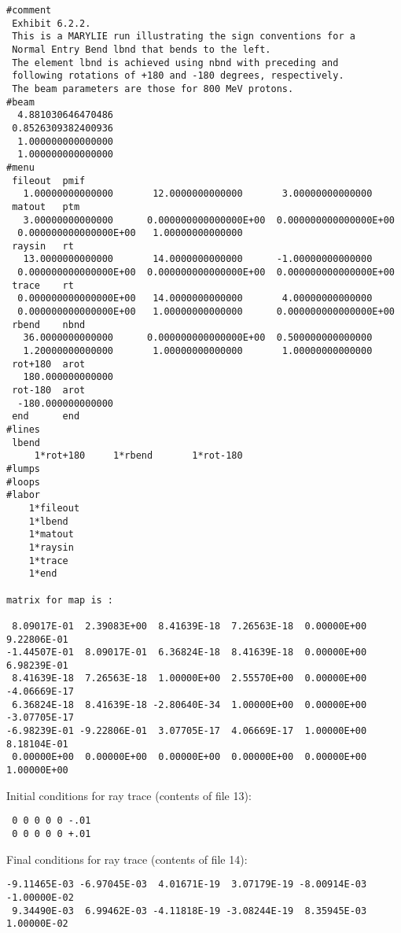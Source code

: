 \newpage
\begin{footnotesize}
\begin{verbatim}
#comment
 Exhibit 6.2.2.
 This is a MARYLIE run illustrating the sign conventions for a
 Normal Entry Bend lbnd that bends to the left.
 The element lbnd is achieved using nbnd with preceding and
 following rotations of +180 and -180 degrees, respectively.
 The beam parameters are those for 800 MeV protons.
#beam
  4.881030646470486
 0.8526309382400936
  1.000000000000000
  1.000000000000000
#menu
 fileout  pmif
   1.00000000000000       12.0000000000000       3.00000000000000
 matout   ptm
   3.00000000000000      0.000000000000000E+00  0.000000000000000E+00
  0.000000000000000E+00   1.00000000000000
 raysin   rt
   13.0000000000000       14.0000000000000      -1.00000000000000
  0.000000000000000E+00  0.000000000000000E+00  0.000000000000000E+00
 trace    rt
  0.000000000000000E+00   14.0000000000000       4.00000000000000
  0.000000000000000E+00   1.00000000000000      0.000000000000000E+00
 rbend    nbnd
   36.0000000000000      0.000000000000000E+00  0.500000000000000
   1.20000000000000       1.00000000000000       1.00000000000000
 rot+180  arot
   180.000000000000
 rot-180  arot
  -180.000000000000
 end      end
#lines
 lbend
     1*rot+180     1*rbend       1*rot-180
#lumps
#loops
#labor
    1*fileout
    1*lbend
    1*matout
    1*raysin
    1*trace
    1*end

matrix for map is :

 8.09017E-01  2.39083E+00  8.41639E-18  7.26563E-18  0.00000E+00  9.22806E-01
-1.44507E-01  8.09017E-01  6.36824E-18  8.41639E-18  0.00000E+00  6.98239E-01
 8.41639E-18  7.26563E-18  1.00000E+00  2.55570E+00  0.00000E+00 -4.06669E-17
 6.36824E-18  8.41639E-18 -2.80640E-34  1.00000E+00  0.00000E+00 -3.07705E-17
-6.98239E-01 -9.22806E-01  3.07705E-17  4.06669E-17  1.00000E+00  8.18104E-01
 0.00000E+00  0.00000E+00  0.00000E+00  0.00000E+00  0.00000E+00  1.00000E+00
\end{verbatim}
\end{footnotesize}
Initial conditions for ray trace (contents of file 13):
\begin{footnotesize}
\begin{verbatim}
 0 0 0 0 0 -.01
 0 0 0 0 0 +.01
\end{verbatim}
\end{footnotesize}
Final conditions for ray trace (contents of file 14):
\begin{footnotesize}
\begin{verbatim}
-9.11465E-03 -6.97045E-03  4.01671E-19  3.07179E-19 -8.00914E-03 -1.00000E-02
 9.34490E-03  6.99462E-03 -4.11818E-19 -3.08244E-19  8.35945E-03  1.00000E-02
\end{verbatim}
\end{footnotesize}


